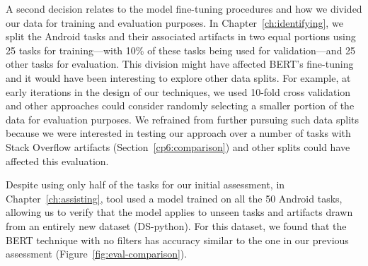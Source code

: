 A second decision relates to the model fine-tuning procedures and how we
divided our data for training and evaluation purposes. 
In Chapter~\ref{ch:identifying}, 
we split the Android tasks and their associated artifacts in two equal portions using 
25 tasks for training---with 10\% of these tasks being used for validation---and 
25 other tasks for evaluation.
This division might have affected BERT's fine-tuning and it would have been interesting 
to explore other data splits. 
For example, at early iterations in the design of our techniques, 
we used 10-fold cross validation~\cite{stone1974cross} 
and other approaches could consider randomly selecting a smaller portion of 
the data for evaluation purposes. 
We refrained from further pursuing such data splits 
because we were interested in testing our approach over 
a number of tasks with Stack Overflow artifacts (Section~\ref{cp6:comparison}) and other splits 
could have affected this evaluation.


Despite using only half of the tasks for our initial assessment, in Chapter~\ref{ch:assisting},
\acs{tool} used a model trained on all the 50 Android tasks,
 allowing us to verify that the model applies to unseen tasks and artifacts 
 drawn from an entirely new dataset (\acs{DS-python}).
 For this dataset, we found that the BERT technique with no filters has 
 accuracy similar to the one in our previous assessment (Figure~\ref{fig:eval-comparison}).









